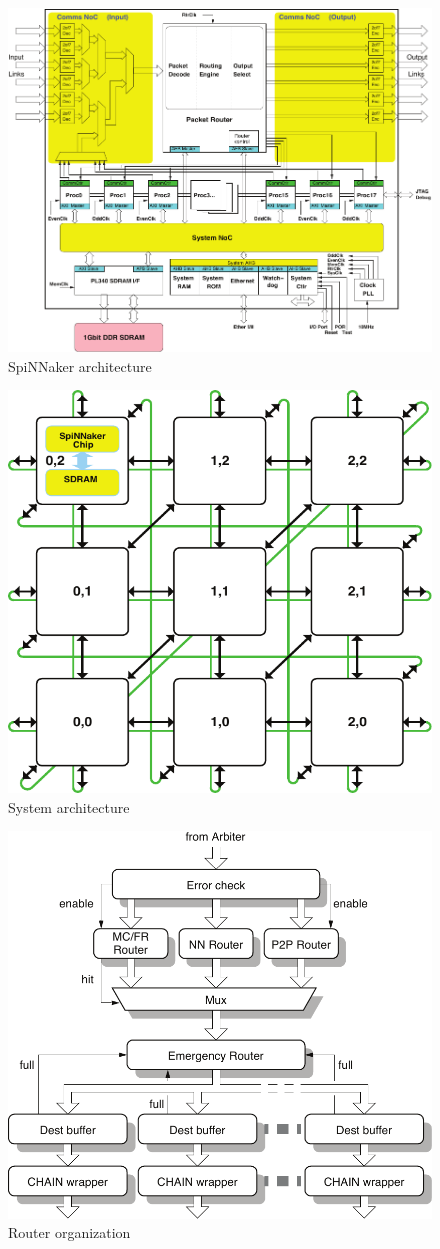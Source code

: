 \documentclass[oneside, a4paper, 11pt]{memoir}
\begin{document}
\begin{figure}[htbp]
	\centering
	\includegraphics[width=0.8\linewidth]{images/spinnaker_architecture.pdf}
	\caption{SpiNNaker architecture}	
\end{figure}

\begin{figure}[htbp]
	\centering
	\includegraphics[width=0.4\linewidth]{images/system_architecture.pdf}
	\caption{System architecture}	
\end{figure}

\begin{figure}[htbp]
	\centering
	\includegraphics[width=0.6\linewidth]{images/router_organization.pdf}
	\caption{Router organization}	
\end{figure}
\end{document}
